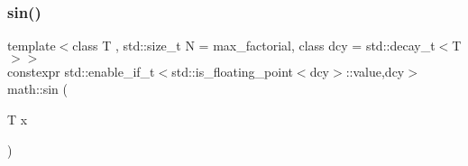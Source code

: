 \subsubsection{\texorpdfstring{sin()}{sin()}}
{\footnotesize\ttfamily template$<$class T , std\+::size\+\_\+t N = max\+\_\+factorial, class dcy  = std\+::decay\+\_\+t$<$\+T$>$$>$ \\
constexpr std\+::enable\+\_\+if\+\_\+t$<$std\+::is\+\_\+floating\+\_\+point$<$dcy$>$\+::value,dcy$>$ math\+::sin (\begin{DoxyParamCaption}\item[{T}]{x }\end{DoxyParamCaption})\hspace{0.3cm}{\ttfamily [noexcept]}}

